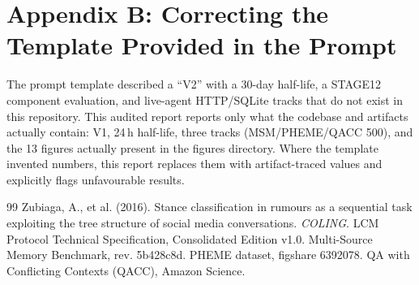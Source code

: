 \documentclass[12pt,a4paper]{article}
\begin{document}
\section{Appendix B: Correcting the Template Provided in the Prompt}
The prompt template described a ``V2'' with a 30-day half-life, a STAGE12 component evaluation, and live-agent HTTP/SQLite tracks that do not exist in this repository. This audited report reports only what the codebase and artifacts actually contain: V1, 24\,h half-life, three tracks (MSM/PHEME/QACC 500), and the 13 figures actually present in the figures directory. Where the template invented numbers, this report replaces them with artifact-traced values and explicitly flags unfavourable results.

\begin{thebibliography}{99}
 Zubiaga, A., et al. (2016). Stance classification in rumours as a sequential task exploiting the tree structure of social media conversations. \textit{COLING}.
 LCM Protocol Technical Specification, Consolidated Edition v1.0.
 Multi-Source Memory Benchmark, rev. 5b428c8d.
 PHEME dataset, figshare 6392078.
 QA with Conflicting Contexts (QACC), Amazon Science.
\end{thebibliography}
\end{document}
